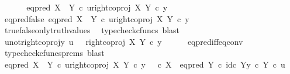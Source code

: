 \begin{isabellebody}
\ \ \isamarkupfalse%
\isanewline
{}\isamarkupfalse%
\isanewline
\ \ \isamarkupfalse%
\ {\isachardoublequoteopen}eq{\isacharunderscore}{\kern0pt}pred\ {\isacharparenleft}{\kern0pt}X\ {\isasymCoprod}\ Y{\isacharparenright}{\kern0pt}\ {\isasymcirc}\isactrlsub c\ {\isasymlangle}u{\isacharcomma}{\kern0pt}right{\isacharunderscore}{\kern0pt}coproj\ X\ Y\ {\isasymcirc}\isactrlsub c\ y{\isasymrangle}\ {\isasymnoteq}\ {\isasymt}{\isachardoublequoteclose}\isanewline
\ \ \isamarkupfalse%
\ \isamarkupfalse%
\ eq{\isacharunderscore}{\kern0pt}pred{\isacharunderscore}{\kern0pt}false{\isacharcolon}{\kern0pt}\ {\isachardoublequoteopen}eq{\isacharunderscore}{\kern0pt}pred\ {\isacharparenleft}{\kern0pt}X\ {\isasymCoprod}\ Y{\isacharparenright}{\kern0pt}\ {\isasymcirc}\isactrlsub c\ {\isasymlangle}u{\isacharcomma}{\kern0pt}right{\isacharunderscore}{\kern0pt}coproj\ X\ Y\ {\isasymcirc}\isactrlsub c\ y{\isasymrangle}\ {\isacharequal}{\kern0pt}\ {\isasymf}{\isachardoublequoteclose}\isanewline
\ \ \ \ \isamarkupfalse%
\ true{\isacharunderscore}{\kern0pt}false{\isacharunderscore}{\kern0pt}only{\isacharunderscore}{\kern0pt}truth{\isacharunderscore}{\kern0pt}values\ \isamarkupfalse%
\ {\isacharparenleft}{\kern0pt}typecheck{\isacharunderscore}{\kern0pt}cfuncs{\isacharcomma}{\kern0pt}\ blast{\isacharparenright}{\kern0pt}\isanewline
\ \ \isamarkupfalse%
\ \isamarkupfalse%
\ u{\isacharunderscore}{\kern0pt}not{\isacharunderscore}{\kern0pt}right{\isacharunderscore}{\kern0pt}coproj{\isacharunderscore}{\kern0pt}y{\isacharcolon}{\kern0pt}\ {\isachardoublequoteopen}u\ \ {\isasymnoteq}\ right{\isacharunderscore}{\kern0pt}coproj\ X\ Y\ {\isasymcirc}\isactrlsub c\ y{\isachardoublequoteclose}\isanewline
\ \ \ \ \isamarkupfalse%
\ eq{\isacharunderscore}{\kern0pt}pred{\isacharunderscore}{\kern0pt}iff{\isacharunderscore}{\kern0pt}eq{\isacharunderscore}{\kern0pt}conv\ \isamarkupfalse%
\ {\isacharparenleft}{\kern0pt}typecheck{\isacharunderscore}{\kern0pt}cfuncs{\isacharunderscore}{\kern0pt}prems{\isacharcomma}{\kern0pt}\ blast{\isacharparenright}{\kern0pt}\isanewline
\isanewline
\ \ \isamarkupfalse%
\ {\isachardoublequoteopen}eq{\isacharunderscore}{\kern0pt}pred\ {\isacharparenleft}{\kern0pt}X\ {\isasymCoprod}\ Y{\isacharparenright}{\kern0pt}\ {\isasymcirc}\isactrlsub c\ {\isasymlangle}u{\isacharcomma}{\kern0pt}right{\isacharunderscore}{\kern0pt}coproj\ X\ Y\ {\isasymcirc}\isactrlsub c\ y{\isasymrangle}\ {\isacharequal}{\kern0pt}\ {\isacharparenleft}{\kern0pt}{\isasymf}\ {\isasymcirc}\isactrlsub c\ {\isasymbeta}\isactrlbsub X\isactrlesub {\isacharparenright}{\kern0pt}\ {\isasymamalg}\ {\isacharparenleft}{\kern0pt}eq{\isacharunderscore}{\kern0pt}pred\ Y\ {\isasymcirc}\isactrlsub c\ {\isasymlangle}id\isactrlsub c\ Y{\isacharcomma}{\kern0pt}y\ {\isasymcirc}\isactrlsub c\ {\isasymbeta}\isactrlbsub Y\isactrlesub {\isasymrangle}{\isacharparenright}{\kern0pt}\ {\isasymcirc}\isactrlsub c\ u{\isachardoublequoteclose}\isanewline

\end{isabellebody}
